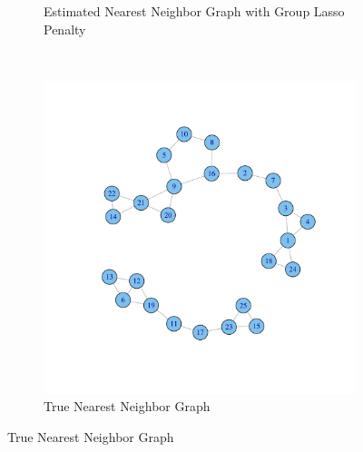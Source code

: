 \documentclass[t]{beamer}
\begin{document}
\begin{frame}
\begin{figure}
\begin{subfigure}[b]{0.40\textwidth}
  \caption{Estimated Nearest Neighbor Graph with Group Lasso Penalty}
\label{fig:nearestgaphsestimate}
\end{subfigure}\\
\begin{subfigure}[b]{0.50\textwidth}
  \includegraphics [scale=0.15]{Omega2-f.pdf}
  \caption{True Nearest Neighbor Graph}
\label{fig:nearestgaphsactual}
\end{subfigure}
\end{figure}
\end{frame}
\end{document}
